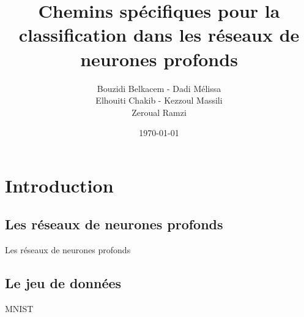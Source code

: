 \documentclass[10pt,handout]{beamer}
\title[Chemins spécifiques]{Chemins spécifiques pour la classification dans les réseaux de neurones profonds}
\author[Bouzidi, Elhouiti, Kezzoul, Zeroual, Dadi]{Bouzidi Belkacem - Dadi Mélissa \\ Elhouiti Chakib - Kezzoul Massili \\ Zeroual Ramzi}
\institute[]{Université de Montpellier}
\date{\today}
\newif\ifplacelogo %
\begin{document}
\placelogofalse
\begin{frame}
	\titlepage
\end{frame}

\placelogotrue

\section{Introduction}
\subsection{Les réseaux de neurones profonds}
\begin{frame}{Les réseaux de neurones profonds}
    
\end{frame}

\placelogofalse 
\subsection{Le jeu de données}
\begin{frame}{MNIST}
\end{frame}
\placelogotrue

\placelogofalse 
\end{document}
